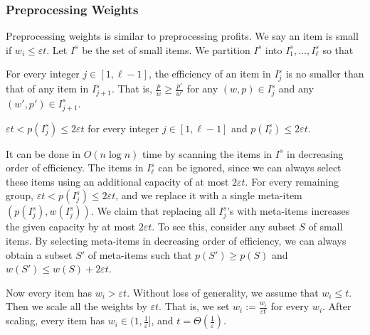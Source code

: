 \documentclass[a4paper,UKenglish,cleveref, autoref, thm-restate, pdfa]{lipics-v2021}
\newcommand{\eps}{\varepsilon}
\renewcommand{\leq}{\leqslant}
\renewcommand{\geq}{\geqslant}
\begin{document}
\subsubsection{Preprocessing Weights}
Preprocessing weights is similar to preprocessing profits. We say an item is small if $w_i \leq \eps t$. Let $I^s$ be the set of small items.  We partition $I^s$ into $I^s_1, \ldots, I^s_\ell$ so that
\begin{romanenumerate}
    \item For every integer $j \in [1, \ell-1]$, the efficiency of an item in $I^s_j$ is no smaller than that of any item in $I^s_{j+1}$. That is, $\frac{p}{w} \geq \frac{p'}{w'}$ for any $(w, p) \in I^s_j$ and any $(w', p') \in I^s_{j+1}$.

    \item $\eps t < p(I^s_j) \leq 2\eps t$ for every integer $j \in [1, \ell - 1]$ and $p(I^s_\ell) \leq 2\eps t$.
\end{romanenumerate}
It can be done in $O(n \log n)$ time by scanning the items in $I^s$ in decreasing order of efficiency.  The items in $I^s_\ell$ can be ignored, since we can always select these items using an additional capacity of at most $2\eps t$. For every remaining group, $\eps t < p(I^s_j) \leq 2\eps t$, and we replace it with a single meta-item $(p(I^s_j), w(I^s_j))$. We claim that replacing all $I^s_j$'s with meta-items increases the given capacity by at most $2\eps t$. To see this, consider any subset $S$ of small items. By selecting meta-items in decreasing order of efficiency, we can always obtain a subset $S'$ of meta-items such that $p(S') \geq p(S)$ and $w(S') \leq w(S) + 2\eps t$.

Now every item has $w_i > \eps t$. Without loss of generality, we assume that $w_i \leq t$. Then we scale all the weights by $\eps t$. That is, we set $w_i:=  \frac{w_i}{\eps t} $ for every $w_i$.  After scaling, every item has $w_i \in (1, \frac{1}{\eps}]$, and $t = \Theta(\frac{1}{\eps})$.
\end{document}

